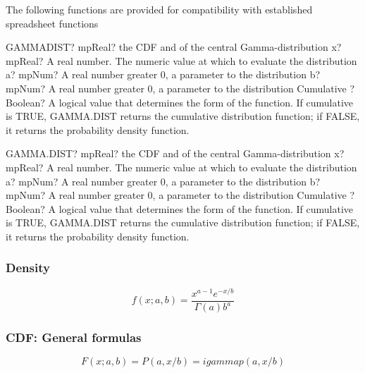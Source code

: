 \vspace{0.3cm}

The following functions are provided for compatibility with established spreadsheet functions

\vspace{0.3cm}
\begin{mpFunctionsExtract}
	\mpWorksheetFunctionFourNotImplemented
	{GAMMADIST? mpReal? the CDF and of the central Gamma-distribution}
	{x? mpReal? A real number. The numeric value at which to evaluate the distribution}
	{a? mpNum? A real number greater 0, a parameter to the distribution}
	{b? mpNum? A real number greater 0, a parameter to the distribution}
	{Cumulative ? Boolean? A logical value that determines the form of the function. If cumulative is TRUE, GAMMA.DIST returns the cumulative distribution function; if FALSE, it returns the probability density function.}
\end{mpFunctionsExtract}

\vspace{0.6cm}
\begin{mpFunctionsExtract}
	\mpWorksheetFunctionFourNotImplemented
	{GAMMA.DIST? mpReal? the CDF and of the central Gamma-distribution}
	{x? mpReal? A real number. The numeric value at which to evaluate the distribution}
	{a? mpNum? A real number greater 0, a parameter to the distribution}
	{b? mpNum? A real number greater 0, a parameter to the distribution}
	{Cumulative ? Boolean? A logical value that determines the form of the function. If cumulative is TRUE, GAMMA.DIST returns the cumulative distribution function; if FALSE, it returns the probability density function.}
\end{mpFunctionsExtract}


\subsubsection{Density}
\label{GammaDistributionDensity}

\begin{equation} 
	f(x; a, b)= \frac{x^{a-1}e^{-x/b}}{\Gamma(a) b^a}
\end{equation}

\subsubsection{CDF: General formulas}

\vspace{0.3cm}
\begin{equation} 
	F(x; a, b)= P(a,x/b) = igammap(a,x/b)
\end{equation}

